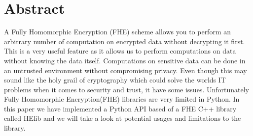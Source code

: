 \chapter*{Abstract}
A Fully Homomorphic Encryption (FHE) scheme allows you to perform an arbitrary number of computation on encrypted data without decrypting it first. This is a very useful feature as it allows us to perform computations on data without knowing the data itself. Computations on sensitive data can be done in an untrusted environment without compromising privacy. Even though this may sound like the holy grail of cryptography which could solve the worlds IT problems when it comes to security and trust, it have some issues. Unfortunately Fully Homomorphic Encryption(FHE) libraries are very limited in Python. In this paper we have implemented a Python API based of a FHE C++ library called HElib and we will take a look at potential usages and limitations to the library.
